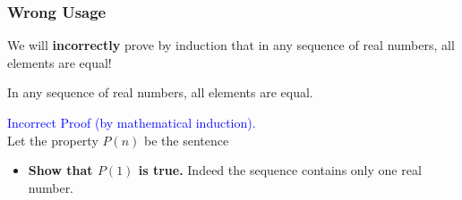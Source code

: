 \documentclass{beamer}
\begin{document}
\begin{frame}%
\frametitle{Wrong Usage}


\footnotesize

We will \textbf{incorrectly} prove by induction that in any sequence of real numbers, all elements are equal!
\begin{block}{}
In any sequence of real numbers, all elements are equal.
\end{block}
\textcolor{blue}{Incorrect Proof (by mathematical induction).}\\
\vspace{0.15cm}
Let the property $P(n)$ be the sentence\\
\begin{center}
\end{center}

\begin{itemize}

\item<3-> \textbf{Show that $P(1)$ is true.} Indeed the sequence contains only one real number.

\end{itemize}


\end{frame}
\end{document}
